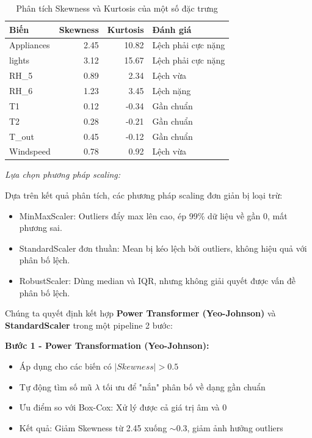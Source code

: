 \begin{table}[H]
\centering
\caption{Phân tích Skewness và Kurtosis của một số đặc trưng}
\label{tab:skewness_analysis}
\small
\begin{tabular}{lrrp{3cm}}
\hline
\textbf{Biến} & \textbf{Skewness} & \textbf{Kurtosis} & \textbf{Đánh giá} \\
\hline
Appliances & 2.45 & 10.82 & Lệch phải cực nặng \\
lights & 3.12 & 15.67 & Lệch phải cực nặng \\
RH\_5 & 0.89 & 2.34 & Lệch vừa \\
RH\_6 & 1.23 & 3.45 & Lệch nặng \\
T1 & 0.12 & -0.34 & Gần chuẩn \\
T2 & 0.28 & -0.21 & Gần chuẩn \\
T\_out & 0.45 & -0.12 & Gần chuẩn \\
Windspeed & 0.78 & 0.92 & Lệch vừa \\
\hline
\end{tabular}
\end{table}

\textit{Lựa chọn phương pháp scaling:}

Dựa trên kết quả phân tích, các phương pháp scaling đơn giản bị loại trừ:
\begin{itemize} [labelsep=10pt, leftmargin=2cm]
    \item MinMaxScaler: Outliers đẩy max lên cao, ép 99\% dữ liệu về gần 0, mất phương sai.
    \item StandardScaler đơn thuần: Mean bị kéo lệch bởi outliers, không hiệu quả với phân bố lệch.
    \item RobustScaler: Dùng median và IQR, nhưng không giải quyết được vấn đề phân bố lệch.
\end{itemize}

Chúng ta quyết định kết hợp \textbf{Power Transformer (Yeo-Johnson)} và \textbf{StandardScaler} trong một pipeline 2 bước:

\textbf{Bước 1 - Power Transformation (Yeo-Johnson):}
\begin{itemize} [labelsep=10pt, leftmargin=2cm]
    \item Áp dụng cho các biến có $|Skewness| > 0.5$
    \item Tự động tìm số mũ $\lambda$ tối ưu để "nắn" phân bố về dạng gần chuẩn
    \item Ưu điểm so với Box-Cox: Xử lý được cả giá trị âm và 0
    \item Kết quả: Giảm Skewness từ 2.45 xuống $\sim$0.3, giảm ảnh hưởng outliers
\end{itemize}

